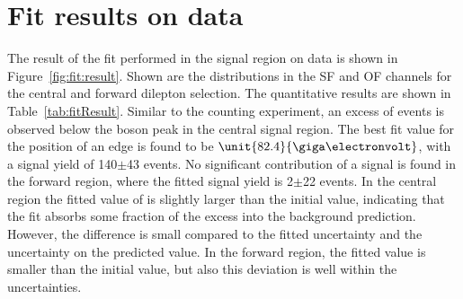 \section{Fit results on data}
The result of the fit performed in the signal region on data is shown in Figure~\ref{fig:fit:result}. Shown are the \mll distributions in the SF and OF channels for the central and forward dilepton selection. The quantitative results are shown in Table~\ref{tab:fitResult}. Similar to the counting experiment, an excess of events is observed below the \Z boson peak in the central signal region. The best fit value for the position of an edge is found to be $\unit{82.4}{\giga\electronvolt}$, with a signal yield of 140$\pm$43 events. No significant contribution of a signal is found in the forward region, where the fitted signal yield is 2$\pm$22 events. In the central region the fitted value of \Rsfof is slightly larger than the initial value, indicating that the fit absorbs some fraction of the excess into the background prediction. However, the difference is small compared to the fitted uncertainty and the uncertainty on the predicted value. In the forward region, the fitted value is smaller than the initial value, but also this deviation is well within the uncertainties. 


